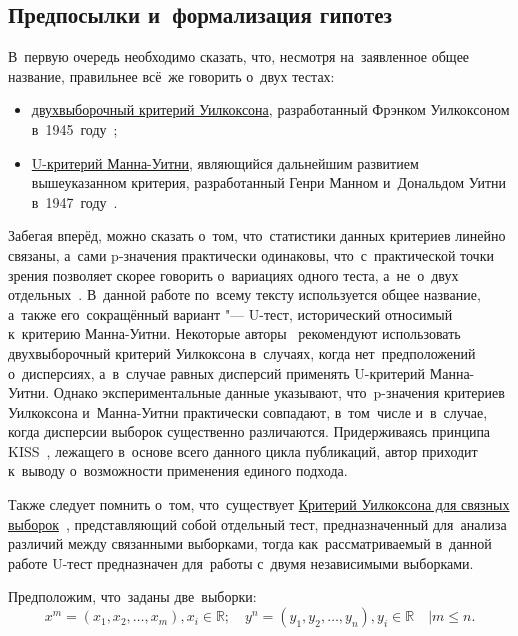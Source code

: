 \documentclass[]{scrartcl}
\begin{document}
\subsection{Предпосылки и~формализация гипотез}
В~первую очередь необходимо сказать, что, несмотря на~заявленное общее название, правильнее всё~же говорить о~двух тестах:
\begin{itemize}
	\item \href{http://www.machinelearning.ru/wiki/index.php?title=Критерий_Уилкоксона_двухвыборочный}{двухвыборочный критерий Уилкоксона}, разработанный Фрэнком Уилкоксоном в~1945~году~\cite{MLRU:Wilcoxon-test};
	\item \href{http://www.machinelearning.ru/wiki/index.php?title=Критерий_Уилкоксона-Манна-Уитни}{U-критерий Манна-Уитни}, являющийся дальнейшим развитием вышеуказанном критерия, разработанный Генри Манном и~Дональдом Уитни в~1947~году~\cite{MLRU:Mann-Whitney}.
\end{itemize}
Забегая вперёд, можно сказать о~том, что~статистики данных критериев линейно связаны, а~сами p-значения практически одинаковы, что~с~практической точки зрения позволяет скорее говорить о~вариациях одного теста, а~не~о~двух отдельных~\cite{MLRU:Wilcoxon-test}. В~данной работе по~всему тексту используется общее название, а~также его~сокращённый вариант "--- U-тест, исторический относимый к~критерию Манна-Уитни. Некоторые авторы~\cite{Kobzarq-prikl-mathstat} рекомендуют использовать двухвыборочный критерий Уилкоксона в~случаях, когда нет~предположений о~дисперсиях, а~в~случае равных дисперсий применять U-критерий Манна-Уитни. Однако экспериментальные данные указывают, что~p-значения критериев Уилкоксона и~Манна-Уитни практически совпадают, в~том~числе и~в~случае, когда дисперсии выборок существенно различаются. Придерживаясь принципа KISS~\cite{KISS-principle}, лежащего в~основе всего данного цикла публикаций, автор приходит к~выводу о~возможности применения единого подхода. 

Также следует помнить о~том, что~существует \href{http://www.machinelearning.ru/wiki/index.php?title=Критерий_Уилкоксона_для_связных_выборок}{Критерий Уилкоксона для связных выборок}~\cite{Wilcoxon-signed-rank-test}, представляющий собой отдельный тест, предназначенный для~анализа различий между связанными выборками, тогда как~рассматриваемый в~данной работе U-тест предназначен для~работы с~двумя независимыми выборками.

Предположим, что~заданы две~выборки:
\begin{equation*}
	x^{m} = (x_{1},x_{2},\ldots,x_{m}), x_{i} \in \mathbb{R};\quad y^{n} = (y_{1},y_{2},\ldots,y_{n}), y_{i} \in \mathbb{R} \quad| m \leq n.
\end{equation*}
 
\end{document}
